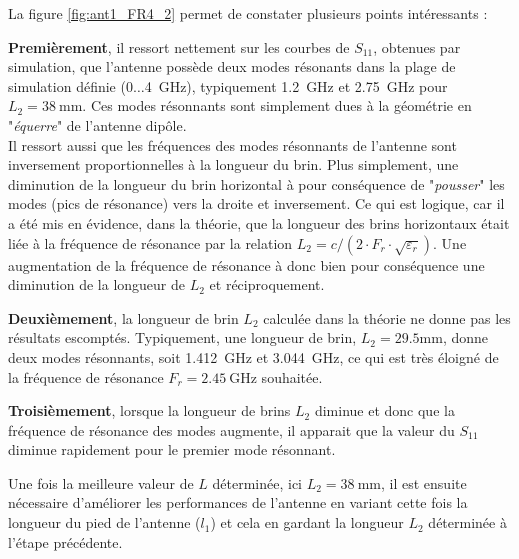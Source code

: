 \documentclass[Deriaz_Traiber_Labo02]{subfiles}
\begin{document}
\begin{flushleft}
	La figure \ref{fig:ant1_FR4_2} permet de constater plusieurs points intéressants :
\end{flushleft}
\begin{description}
\item \textbf{Premièrement}, il ressort nettement sur les courbes de $S_{11}$, obtenues par simulation, que l'antenne possède deux modes résonants dans la plage de simulation définie ($0\dots$\SI{4}{\giga\hertz}), typiquement \SI{1.2}{\giga\hertz} et \SI{2.75}{\giga\hertz} pour $L_2 = \SI{38}{\milli\meter}$. Ces modes résonnants sont simplement dues à la géométrie en "\textit{équerre}" de l'antenne dipôle.\\
Il ressort aussi que les fréquences des modes résonnants de l'antenne sont inversement proportionnelles à la longueur du brin. Plus simplement, une diminution de la longueur du brin horizontal à pour conséquence de "\textit{pousser}" les modes (pics de résonance) vers la droite et inversement. Ce qui est logique, car il a été mis en évidence, dans la théorie, que la longueur des brins horizontaux était liée à la fréquence de résonance par la relation  $L_2 = c/(2\cdot F_r \cdot \sqrt{\varepsilon_r})$. Une augmentation de la fréquence de résonance à donc bien pour conséquence une diminution de la longueur de $L_2$ et réciproquement.\\

\item \textbf{Deuxièmement}, la longueur de brin $L_2$ calculée dans la théorie ne donne pas les résultats escomptés. Typiquement, une longueur de brin, $L_2=29.5\si{\milli\meter}$, donne deux modes résonnants, soit \SI{1.412}{\giga\hertz} et \SI{3.044}{\giga\hertz}, ce qui est très éloigné de la fréquence de résonance $F_r=\SI{2.45}{\giga\hertz}$ souhaitée.\\

\item \textbf{Troisièmement}, lorsque la longueur de brins $L_2$ diminue et donc que la fréquence de résonance des modes augmente, il apparait que la valeur du $S_{11}$ diminue rapidement pour le premier mode résonnant.\\
\end{description}

\pagebreak

Une fois la meilleure valeur de $L$ déterminée, ici $L_2 = \SI{38}{\milli\meter}$, il est ensuite nécessaire d'améliorer les performances de l'antenne en variant cette fois la longueur du pied de l'antenne ($l_1$) et cela en gardant la longueur $L_2$ déterminée à l'étape précédente.\\
\end{document}
